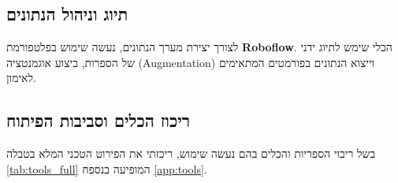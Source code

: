 \subsection{תיוג וניהול הנתונים}

לצורך יצירת מערך הנתונים, נעשה
שימוש בפלטפורמת \textbf{\textenglish{Roboflow}}. הכלי שימש לתיוג ידני
של הספרות, ביצוע אוגמנטציה (\textenglish{Augmentation}) וייצוא
הנתונים בפורמטים המתאימים לאימון.

\subsection{ריכוז הכלים וסביבות הפיתוח}
בשל ריבוי הספריות והכלים בהם נעשה שימוש, ריכזתי את הפירוט הטכני המלא בטבלה \ref{tab:tools_full} המופיעה בנספח \ref{app:tools}.

